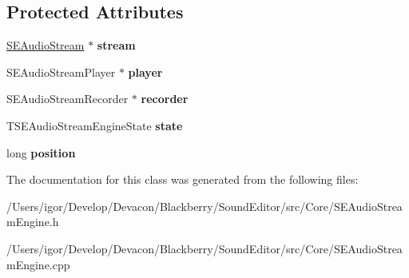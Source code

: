 \subsection*{Protected Attributes}
\begin{DoxyCompactItemize}
\item 
\hypertarget{class_s_e_audio_stream_engine_a686e9ac0b8133e2da5e5aac566fe312e}{\hyperlink{class_s_e_audio_stream}{S\+E\+Audio\+Stream} $\ast$ {\bfseries stream}}\label{class_s_e_audio_stream_engine_a686e9ac0b8133e2da5e5aac566fe312e}

\item 
\hypertarget{class_s_e_audio_stream_engine_a33e4a362e1da557272aee227935da239}{S\+E\+Audio\+Stream\+Player $\ast$ {\bfseries player}}\label{class_s_e_audio_stream_engine_a33e4a362e1da557272aee227935da239}

\item 
\hypertarget{class_s_e_audio_stream_engine_ac492313c93cee8d5ca05fc5001a4afdc}{S\+E\+Audio\+Stream\+Recorder $\ast$ {\bfseries recorder}}\label{class_s_e_audio_stream_engine_ac492313c93cee8d5ca05fc5001a4afdc}

\item 
\hypertarget{class_s_e_audio_stream_engine_a124d47656b0b46ef4ec62ead90d17c47}{T\+S\+E\+Audio\+Stream\+Engine\+State {\bfseries state}}\label{class_s_e_audio_stream_engine_a124d47656b0b46ef4ec62ead90d17c47}

\item 
\hypertarget{class_s_e_audio_stream_engine_a3899ff2022b38cd5a0dc132a53ba417f}{long {\bfseries position}}\label{class_s_e_audio_stream_engine_a3899ff2022b38cd5a0dc132a53ba417f}

\end{DoxyCompactItemize}


The documentation for this class was generated from the following files\+:\begin{DoxyCompactItemize}
\item 
/\+Users/igor/\+Develop/\+Devacon/\+Blackberry/\+Sound\+Editor/src/\+Core/S\+E\+Audio\+Stream\+Engine.\+h\item 
/\+Users/igor/\+Develop/\+Devacon/\+Blackberry/\+Sound\+Editor/src/\+Core/S\+E\+Audio\+Stream\+Engine.\+cpp\end{DoxyCompactItemize}
